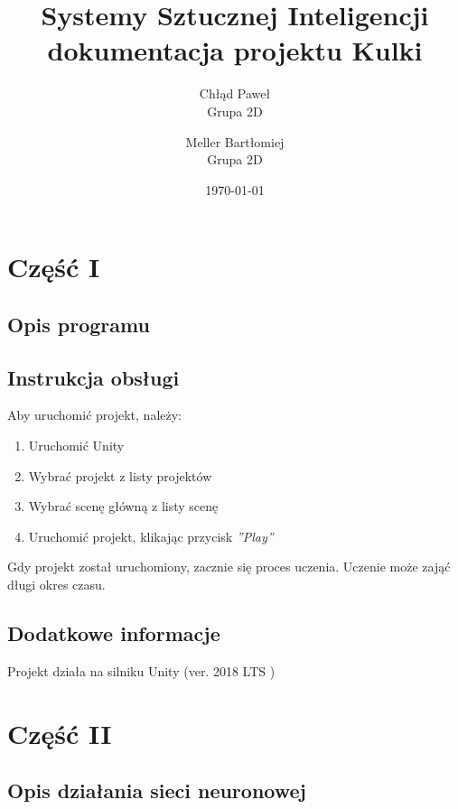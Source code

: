 \documentclass[12pt,a4paper]{article}
\begin{document}
\title{Systemy Sztucznej Inteligencji\\\small{dokumentacja projektu Kulki}}
\author{
    Chłąd Paweł\\
    Grupa 2D
    \and
    Meller Bartłomiej\\
    Grupa 2D}
\date{\today}

\maketitle
\newpage
\section*{Część I}
\subsection*{Opis programu}

\subsection*{Instrukcja obsługi}
Aby uruchomić projekt, należy:
\begin{enumerate}
    \item Uruchomić Unity
    \item Wybrać projekt z listy projektów
    \item Wybrać scenę główną z listy scenę
    \item Uruchomić projekt, klikając przycisk \textit{''Play''}
\end{enumerate}

Gdy projekt został uruchomiony, zacznie się proces uczenia. Uczenie może zająć długi okres czasu.

\subsection*{Dodatkowe informacje}
Projekt działa na silniku Unity (ver. 2018 LTS )
\newpage
\section*{Część II}


\subsection*{Opis działania sieci neuronowej}
\end{document}
